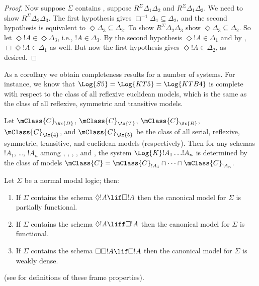 \documentclass[../../../include/open-logic-section]{subfiles}
\begin{document}
\begin{proof}
  Now suppose $\Sigma$ contains , suppose $R^\Sigma
  \Delta_1\Delta_2$ and $R^\Sigma \Delta_1\Delta_3$. We need to show
  $R^\Sigma \Delta_2\Delta_3$. The first hypothesis gives
  $\Box^{-1}\Delta_1 \subseteq \Delta_2$, and the second hypothesis is
  equivalent to $\Diamond\Delta_3 \subseteq \Delta_2$.  To show $R^\Sigma
  \Delta_2\Delta_3$
  show $\Diamond\Delta_3 \subseteq \Delta_2$. So let $\Diamond!A \in
  \Diamond\Delta_3$, i.e., $!A \in \Delta_3$. By the second hypothesis
  $\Diamond!A \in \Delta_1$ and by , $\Box\Diamond!A \in
  \Delta_1$ as well. But now the first hypothesis gives $\Diamond!A \in
  \Delta_2$, as desired.
  \end{proof}

As a corollary we obtain completeness results for a number of
systems. For instance, we know that $\Log{S5} = \Log{KT5} =
\Log{KTB4}$ is complete with respect to the class of all reflexive
euclidean models, which is the same as the class of all reflexive,
symmetric and transitive models.

\begin{thm}
  Let $\mClass{C}_\Ax{D}$, $\mClass{C}_\Ax{T}$,
  $\mClass{C}_\Ax{B}$, $\mClass{C}_\Ax{4}$, and
  $\mClass{C}_\Ax{5}$ be the class of all serial, reflexive,
  symmetric, transitive, and euclidean models (respectively). Then for
  any schemas $!A_1$, \dots, $!A_n$ among ,
  , , , and , the system
  $\Log{K}!A_1 \dots !A_n$ is determined by the
  class of models $\mClass{C} = \mClass{C}_{!A_1} \cap \dots
  \cap \mClass{C}_{!A_n}$. 
\end{thm}

\begin{prop}
  Let $\Sigma$ be a normal modal logic; then:
  \begin{enumerate}
  \item{}%
    If $\Sigma$ contains the schema $\Diamond!A \lif \Box 
    !A$ then the canonical model for $\Sigma$ is partially functional. 
  \item If $\Sigma$ contains the schema $\Diamond!A \liff \Box 
    !A$ then the canonical model for $\Sigma$ is functional. 
  \item If $\Sigma$ contains the schema $\Box\Box!A \lif \Box 
    !A$ then the canonical model for $\Sigma$ is weakly dense. 
  \end{enumerate}
(see  for definitions of these frame
  properties).
\end{prop}
\end{document}
